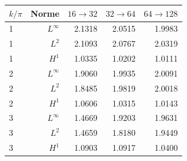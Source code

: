 \begin{tabular}{lrrrr}
\toprule
\(k/\pi\) & Norme & \(16\to32\) & \(32\to64\) & \(64\to128\) \\
\midrule
1 & \(L^\infty\) & 2.1318 & 2.0515 & 1.9983 \\
1 & \(L^2\) & 2.1093 & 2.0767 & 2.0319 \\
1 & \(H^1\) & 1.0335 & 1.0202 & 1.0111 \\
2 & \(L^\infty\) & 1.9060 & 1.9935 & 2.0091 \\
2 & \(L^2\) & 1.8485 & 1.9819 & 2.0018 \\
2 & \(H^1\) & 1.0606 & 1.0315 & 1.0143 \\
3 & \(L^\infty\) & 1.4669 & 1.9203 & 1.9631 \\
3 & \(L^2\) & 1.4659 & 1.8180 & 1.9449 \\
3 & \(H^1\) & 1.0903 & 1.0917 & 1.0400 \\
\bottomrule
\end{tabular}
